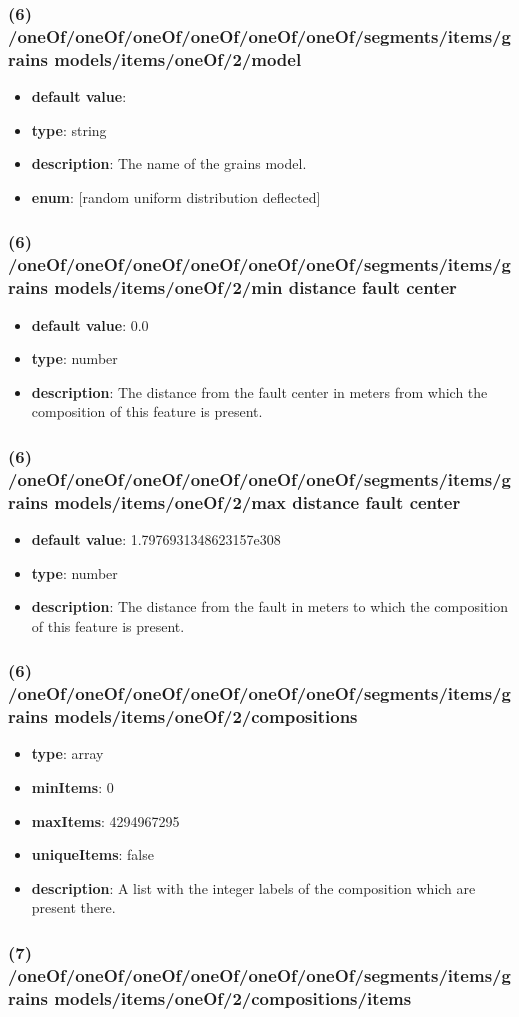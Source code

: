 \subsubsection{(6) /oneOf/oneOf/oneOf/oneOf/oneOf/oneOf/segments/items/grains models/items/oneOf/2/model}
\begin{itemize}[leftmargin=6em]\item {\bf default value}: 
\item {\bf type}: string
\item {\bf description}: The name of the grains model.
\item {\bf enum}: [random uniform distribution deflected]\end{itemize}\subsubsection{(6) /oneOf/oneOf/oneOf/oneOf/oneOf/oneOf/segments/items/grains models/items/oneOf/2/min distance fault center}
\begin{itemize}[leftmargin=6em]\item {\bf default value}: 0.0
\item {\bf type}: number
\item {\bf description}: The distance from the fault center in meters from which the composition of this feature is present.
\end{itemize}\subsubsection{(6) /oneOf/oneOf/oneOf/oneOf/oneOf/oneOf/segments/items/grains models/items/oneOf/2/max distance fault center}
\begin{itemize}[leftmargin=6em]\item {\bf default value}: 1.7976931348623157e308
\item {\bf type}: number
\item {\bf description}: The distance from the fault in meters to which the composition of this feature is present.
\end{itemize}\subsubsection{(6) /oneOf/oneOf/oneOf/oneOf/oneOf/oneOf/segments/items/grains models/items/oneOf/2/compositions}
\begin{itemize}[leftmargin=6em]\item {\bf type}: array
\item {\bf minItems}: 0
\item {\bf maxItems}: 4294967295
\item {\bf uniqueItems}: false
\item {\bf description}: A list with the integer labels of the composition which are present there.
\end{itemize}\subsubsection{(7) /oneOf/oneOf/oneOf/oneOf/oneOf/oneOf/segments/items/grains models/items/oneOf/2/compositions/items}
